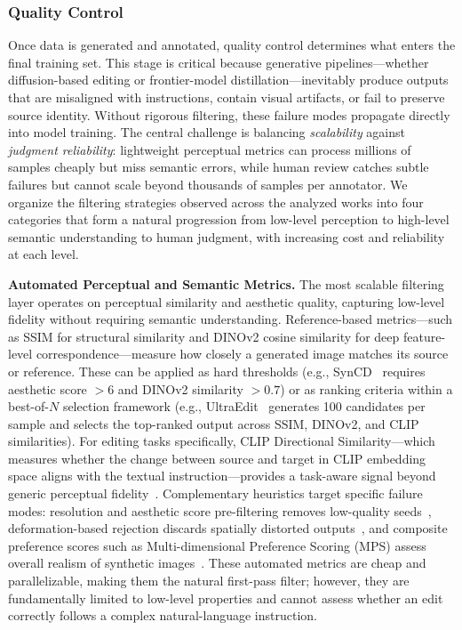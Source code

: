 \documentclass{llmxive}
\begin{document}
\subsubsection{Quality Control}
\label{sec:quality}

Once data is generated and annotated, quality control determines what enters the final training set. This stage is critical because generative pipelines---whether diffusion-based editing or frontier-model distillation---inevitably produce outputs that are misaligned with instructions, contain visual artifacts, or fail to preserve source identity. Without rigorous filtering, these failure modes propagate directly into model training. The central challenge is balancing \emph{scalability} against \emph{judgment reliability}: lightweight perceptual metrics can process millions of samples cheaply but miss semantic errors, while human review catches subtle failures but cannot scale beyond thousands of samples per annotator. We organize the filtering strategies observed across the analyzed works into four categories that form a natural progression from low-level perception to high-level semantic understanding to human judgment, with increasing cost and reliability at each level.

\textbf{Automated Perceptual and Semantic Metrics.}
The most scalable filtering layer operates on perceptual similarity and aesthetic quality, capturing low-level fidelity without requiring semantic understanding. Reference-based metrics---such as SSIM for structural similarity and DINOv2 cosine similarity for deep feature-level correspondence---measure how closely a generated image matches its source or reference. These can be applied as hard thresholds (e.g., SynCD~\citep{kumari2025generating} requires aesthetic score ${>}6$ and DINOv2 similarity ${>}0.7$) or as ranking criteria within a best-of-$N$ selection framework (e.g., UltraEdit~\citep{zhao2024ultraedit} generates 100 candidates per sample and selects the top-ranked output across SSIM, DINOv2, and CLIP similarities). For editing tasks specifically, CLIP Directional Similarity---which measures whether the change between source and target in CLIP embedding space aligns with the textual instruction---provides a task-aware signal beyond generic perceptual fidelity~\citep{zhao2024ultraedit}. Complementary heuristics target specific failure modes: resolution and aesthetic score pre-filtering removes low-quality seeds~\citep{ye2025imgedit}, deformation-based rejection discards spatially distorted outputs~\citep{hui2024hq}, and composite preference scores such as Multi-dimensional Preference Scoring (MPS) assess overall realism of synthetic images~\citep{bertazzini2025dragon}. These automated metrics are cheap and parallelizable, making them the natural first-pass filter; however, they are fundamentally limited to low-level properties and cannot assess whether an edit correctly follows a complex natural-language instruction.
\end{document}
